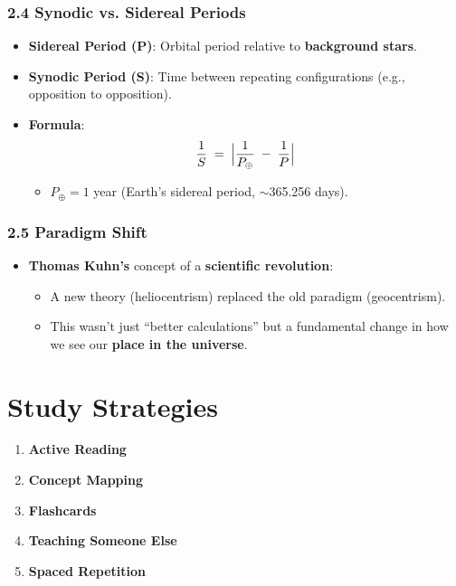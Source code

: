 \subsubsection*{2.4 Synodic vs. Sidereal Periods}
\begin{itemize}
    \item \textbf{Sidereal Period (P)}: Orbital period relative to \textbf{background stars}.
    \item \textbf{Synodic Period (S)}: Time between repeating configurations (e.g., opposition to opposition).
    \item \textbf{Formula}:
    \[
      \frac{1}{S} \;=\;
      \Bigl|\frac{1}{P_\oplus} \;-\; \frac{1}{P}\Bigr|
    \]
    \begin{itemize}
        \item $P_\oplus = 1$ year (Earth’s sidereal period, $\sim$365.256 days).
    \end{itemize}
\end{itemize}

\subsubsection*{2.5 Paradigm Shift}
\begin{itemize}
    \item \textbf{Thomas Kuhn’s} concept of a \textbf{scientific revolution}:
    \begin{itemize}
        \item A new theory (heliocentrism) replaced the old paradigm (geocentrism).
        \item This wasn’t just ``better calculations'' but a fundamental change in how we see our \textbf{place in the universe}.
    \end{itemize}
\end{itemize}

\section*{Study Strategies}
\begin{enumerate}
    \item \textbf{Active Reading}
    \item \textbf{Concept Mapping}
    \item \textbf{Flashcards}
    \item \textbf{Teaching Someone Else}
    \item \textbf{Spaced Repetition}
\end{enumerate}

